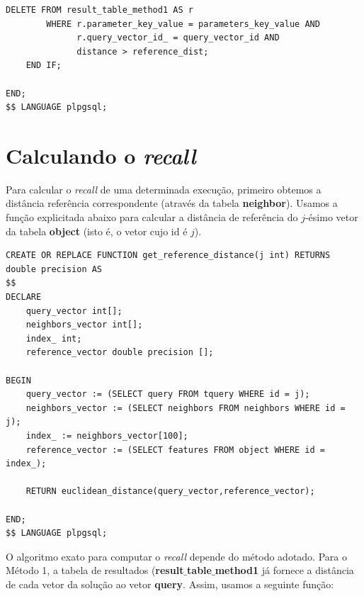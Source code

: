 \documentclass[a4paper,12pt,titlepage]{scrartcl}
\begin{document}
\begin{lstlisting}[caption = O algoritmo do Método 1., label = algmetodo1]
		DELETE FROM result_table_method1 AS r
		WHERE r.parameter_key_value = parameters_key_value AND
			  r.query_vector_id_ = query_vector_id AND
			  distance > reference_dist;
	END IF;
	
END;
$$ LANGUAGE plpgsql;

\end{lstlisting}
\vspace{5mm}

\section{Calculando o \textit{recall}}

Para calcular o \emph{recall} de uma determinada execução, primeiro obtemos a distância referência correspondente (através da tabela \textbf{neighbor}). Usamos a função explicitada abaixo para calcular a distância de referência do $j$-ésimo vetor da tabela \textbf{object} (isto é, o vetor cujo id é $j$).\\

\begin{lstlisting}[caption = Calculando a distância de referência., label = refdist]
CREATE OR REPLACE FUNCTION get_reference_distance(j int) RETURNS double precision AS
$$
DECLARE
	query_vector int[];
	neighbors_vector int[];
	index_ int;
	reference_vector double precision [];
	
BEGIN 
	query_vector := (SELECT query FROM tquery WHERE id = j);
 	neighbors_vector := (SELECT neighbors FROM neighbors WHERE id = j);
	index_ := neighbors_vector[100];
	reference_vector := (SELECT features FROM object WHERE id = index_);
	
	RETURN euclidean_distance(query_vector,reference_vector);
	
END;
$$ LANGUAGE plpgsql;

\end{lstlisting}
\vspace{5mm}

O algoritmo exato para computar o \emph{recall} depende do método adotado. Para o Método 1, a tabela de resultados (\textbf{result$\_$table$\_$method1} já fornece a distância de cada vetor da solução ao vetor \textbf{query}. Assim, usamos a seguinte função:\\
\end{document}
